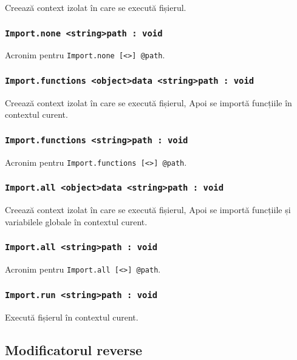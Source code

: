 Creează context izolat în care se execută fișierul.

\subsubsection{\lstinline|Import.none <string>path : void|}

Acronim pentru \lstinline|Import.none [<>] @path|.

\subsubsection{\lstinline|Import.functions <object>data <string>path : void|}

Creează context izolat în care se execută fișierul, Apoi se importă funcțiile în contextul curent.

\subsubsection{\lstinline|Import.functions <string>path : void|}

Acronim pentru \lstinline|Import.functions [<>] @path|.

\subsubsection{\lstinline|Import.all <object>data <string>path : void|}

Creează context izolat în care se execută fișierul, Apoi se importă funcțiile și variabilele globale în contextul curent.

\subsubsection{\lstinline|Import.all <string>path : void|}

Acronim pentru \lstinline|Import.all [<>] @path|.

\subsubsection{\lstinline|Import.run <string>path : void|}

Execută fișierul în contextul curent.

\subsection{Modificatorul {\color{blue2} reverse}}

